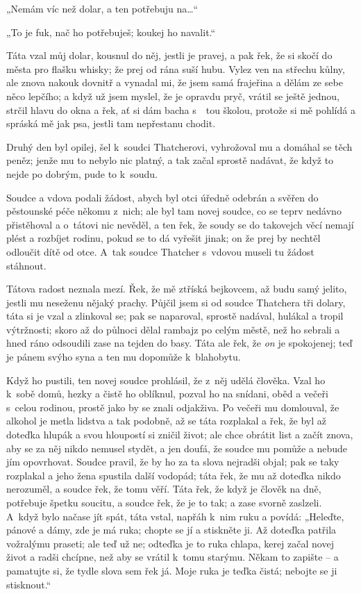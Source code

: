„Nemám víc než dolar, a ten potřebuju na\ldots“

„To je fuk, nač ho potřebuješ; koukej ho navalit.“

Táta vzal můj dolar, kousnul do něj, jestli je pravej, a pak řek, že si skočí do města pro flašku whisky; že prej od rána suší hubu. Vylez ven na střechu kůlny, ale znova nakouk dovnitř a vynadal mi, že jsem samá frajeřina a dělám ze sebe něco lepčího; a když už jsem myslel, že je opravdu pryč, vrátil se ještě jednou, strčil hlavu do okna a řek, ať si dám bacha s~ tou školou, protože si mě pohlídá a spráská mě jak psa, jestli tam nepřestanu chodit.

Druhý den byl opilej, šel k soudci Thatcherovi, vyhrožoval mu a domáhal se těch peněz; jenže mu to nebylo nic platný, a tak začal sprostě nadávat, že když to nejde po dobrým, pude to k soudu.

Soudce a vdova podali žádost, abych byl otci úředně odebrán a svěřen do pěstounské péče někomu z nich; ale byl tam novej soudce, co se teprv nedávno přistěhoval a o~tátovi nic nevěděl, a ten řek, že soudy se do takovejch věcí nemají plést a rozbíjet rodinu, pokud se to dá vyřešit jinak; on že prej by nechtěl odloučit dítě od otce. A~tak soudce Thatcher s~vdovou museli tu žádost stáhnout.

Tátova radost neznala mezí. Řek, že mě ztříská bejkovcem, až budu samý jelito, jestli mu neseženu nějaký prachy. Půjčil jsem si od soudce Thatchera tři dolary, táta si je vzal a zlinkoval se; pak se naparoval, sprostě nadával, hulákal a tropil výtržnosti; skoro až do půlnoci dělal rambajz po celým městě, než ho sebrali a hned ráno odsoudili zase na tejden do basy. Táta ale řek, že \textit{on} je spokojenej; teď je pánem svýho syna a ten mu dopomůže k blahobytu.

Když ho pustili, ten novej soudce prohlásil, že z něj udělá člověka. Vzal ho k sobě domů, hezky a čistě ho oblíknul, pozval ho na snídani, oběd a večeři s~celou rodinou, prostě jako by se znali odjakživa. Po večeři mu domlouval, že alkohol je metla lidstva a tak podobně, až se táta rozplakal a řek, že byl až doteďka hlupák a svou hloupostí si zničil život; ale chce obrátit list a začít znova, aby se za něj nikdo nemusel stydět, a jen doufá, že soudce mu pomůže a nebude jím opovrhovat. Soudce pravil, že by ho za ta slova nejradši objal; pak se taky rozplakal a jeho žena spustila další vodopád; táta řek, že mu až doteďka nikdo nerozuměl, a soudce řek, že tomu věří. Táta řek, že když je člověk na dně, potřebuje špetku soucitu, a soudce řek, že je to tak; a zase svorně zaslzeli. A~když bylo načase jít spát, táta vstal, napřáh k nim ruku a povídá:
„Heleďte, pánové a dámy, zde je má ruka; chopte se jí a stiskněte ji. Až doteďka patřila vožralýmu praseti; ale teď už ne; odteďka je to ruka chlapa, kerej začal novej život a radši chcípne, než aby se vrátil k tomu starýmu. Někam to zapište  – a pamatujte si, že tydle slova sem řek já. Moje ruka je teďka čistá; nebojte se ji stisknout.“

